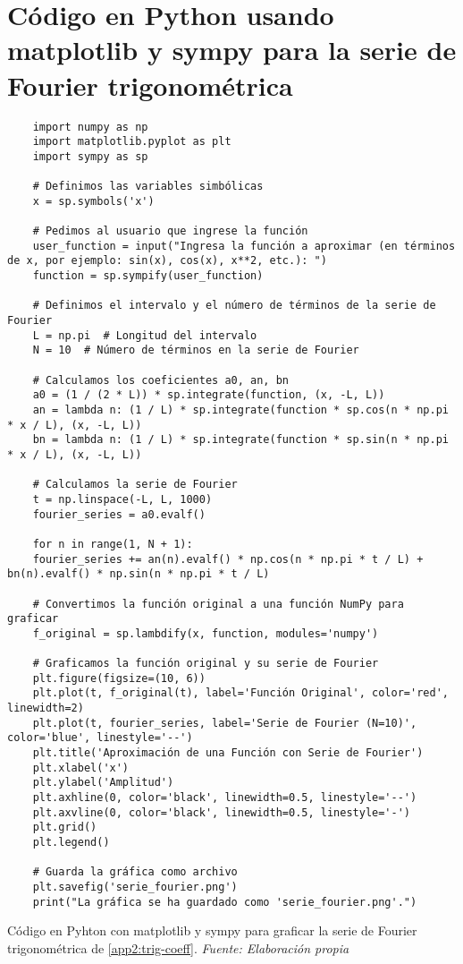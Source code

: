 \section{Código en Python usando matplotlib y sympy para la serie de Fourier trigonométrica}\label{app3:trig-code-python-matplotlib-sympy}
\begin{longlisting}
	\begin{verbatim}
	import numpy as np
	import matplotlib.pyplot as plt
	import sympy as sp
	
	# Definimos las variables simbólicas
	x = sp.symbols('x')
	
	# Pedimos al usuario que ingrese la función
	user_function = input("Ingresa la función a aproximar (en términos de x, por ejemplo: sin(x), cos(x), x**2, etc.): ")
	function = sp.sympify(user_function)
	
	# Definimos el intervalo y el número de términos de la serie de Fourier
	L = np.pi  # Longitud del intervalo
	N = 10  # Número de términos en la serie de Fourier
	
	# Calculamos los coeficientes a0, an, bn
	a0 = (1 / (2 * L)) * sp.integrate(function, (x, -L, L))
	an = lambda n: (1 / L) * sp.integrate(function * sp.cos(n * np.pi * x / L), (x, -L, L))
	bn = lambda n: (1 / L) * sp.integrate(function * sp.sin(n * np.pi * x / L), (x, -L, L))
	
	# Calculamos la serie de Fourier
	t = np.linspace(-L, L, 1000)
	fourier_series = a0.evalf()
	
	for n in range(1, N + 1):
	fourier_series += an(n).evalf() * np.cos(n * np.pi * t / L) + bn(n).evalf() * np.sin(n * np.pi * t / L)
	
	# Convertimos la función original a una función NumPy para graficar
	f_original = sp.lambdify(x, function, modules='numpy')
	
	# Graficamos la función original y su serie de Fourier
	plt.figure(figsize=(10, 6))
	plt.plot(t, f_original(t), label='Función Original', color='red', linewidth=2)
	plt.plot(t, fourier_series, label='Serie de Fourier (N=10)', color='blue', linestyle='--')
	plt.title('Aproximación de una Función con Serie de Fourier')
	plt.xlabel('x')
	plt.ylabel('Amplitud')
	plt.axhline(0, color='black', linewidth=0.5, linestyle='--')
	plt.axvline(0, color='black', linewidth=0.5, linestyle='-')
	plt.grid()
	plt.legend()
	
	# Guarda la gráfica como archivo
	plt.savefig('serie_fourier.png')
	print("La gráfica se ha guardado como 'serie_fourier.png'.")
	\end{verbatim}
	\caption[Código en Pyhton con matplotlib y sympy para graficar la serie de Fourier trigonométrica de \ref{app2:trig-coeff}.] {Código en Pyhton con matplotlib y sympy para graficar la serie de Fourier trigonométrica de \ref{app2:trig-coeff}. \textit{Fuente: Elaboración propia}} 
\end{longlisting}


